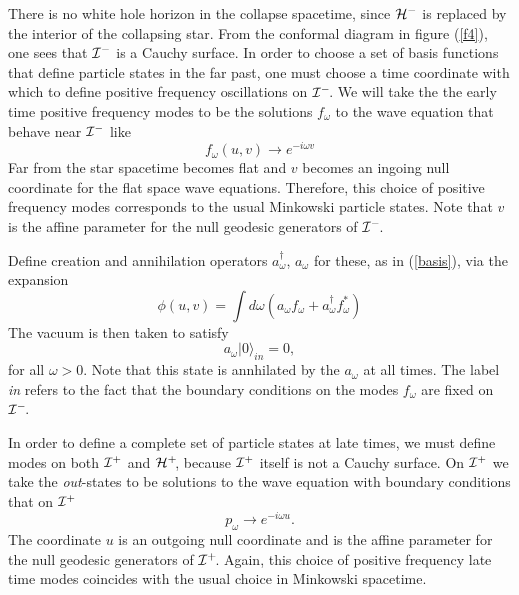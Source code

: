 \documentclass[12pt]{article}
\newcommand{\be}{\begin{equation}}
\newcommand{\ee}{\end{equation}}
\newcommand{\p}{\partial}
\def\fh{{\cal H}^+}
\def\ph{{\cal H}^-}
\def\finf{{\cal I}^+}
\def\pinf{{\cal I}^-}
\def\f{f_{\omega}}
\def\p{p_{\omega}}
\def\a{a_\omega}
\def\ad{a^{\dagger}_{\omega} }
\def\vac{|0\rangle_{in} }
\begin{document}
There is no white hole horizon in the collapse spacetime,  since
$\ph$ is replaced by the interior of the collapsing star. From the
conformal diagram in figure (\ref{f4}), one sees that $\pinf$ is a Cauchy surface.
In order to choose a set of basis functions that define particle states in the
far past, one must choose a time coordinate with which to define positive
frequency oscillations on $\pinf\!$.  We will take the the early time positive
frequency modes to be the solutions $\f$ to the wave equation that
behave near $\pinf$ like
%
\be\label{inmodes} \f (u,v)\rightarrow e^{-i\omega v}\ee
%
Far from the star spacetime becomes flat and $v$ becomes
an ingoing null coordinate for the flat space wave equations. Therefore,
this choice of
positive frequency modes corresponds to the usual Minkowski particle
states. Note that
$v$ is the affine parameter for the null geodesic generators of $\pinf\!$.

Define creation and annihilation operators $\ad$, $\a$ for these, as in
(\ref{basis}), via
the  expansion
%
\be\label{basthree}\phi(u,v) = \int d\omega (  \a \f + \a^{\dagger} \f^* ) \ee
%
The vacuum is then taken to satisfy
%
\be\label{vacstate} \a \vac =0, \ee
%
for all $\omega>0$.
Note that this state is annhilated by the $\a$ at all times. The label
{\it in} refers to the fact that the
boundary conditions on the modes $\f$ are fixed on $\pinf\!$.

In order to define a complete set of particle states at late times, we must
define modes on both $\finf$ and $\fh\!$, because $\finf$ itself is not a Cauchy
surface. On $\finf$ we take the {\it out}-states to be solutions
to the wave equation with boundary conditions that on $\finf$
%
\be\label{outmodes}\p \rightarrow e^{-i\omega u}.\ee
%
The coordinate $u$ is an outgoing null coordinate and is the affine parameter
for the null geodesic generators of $\finf\!$.
Again, this choice of positive frequency late time modes coincides
with the usual choice in Minkowski spacetime.
\end{document}
